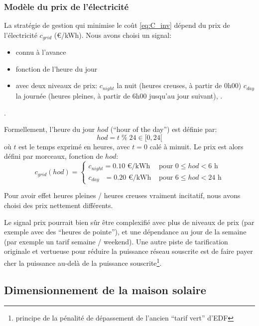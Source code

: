 \documentclass[a4paper,10pt,twocolumn]{article}
\begin{document}
\subsubsection{Modèle du prix de l'électricité}

La stratégie de gestion qui minimise le coût \eqref{eq:C_inv}
dépend du prix de l'électricité $c_{grid}$ (€/kWh).
Nous avons choisi un signal:

\begin{itemize}
 \item connu à l'avance
 \item fonction de l'heure du jour
 \item avec deux niveaux de prix:
 $c_{night}$ la nuit (heures creuses, à partir de 0h00)
 $c_{day}$ la journée (heures pleines, à partir de 6h00 jusqu'au jour suivant), .
\end{itemize}.

Formellement, l'heure du jour $hod$ (``hour of the day'') est définie par:
%
\begin{equation} \label{eq:hod}
  hod = t \; \% \; 24 \in [0, 24[
\end{equation} 
où $t$ est le temps exprimé en heures, avec $t=0$ calé à minuit.
Le prix est alors défini par morceaux, fonction de $hod$:
\begin{equation}
  c_{grid}(hod) = \begin{cases}
    c_{night} = 0.10 \text{ €/kWh} & \text{ pour } 0 \leq hod < 6\text{ h}\\
    c_{day} \;\;\,  = 0.20 \text{ €/kWh} & \text{ pour } 6 \leq hod < 24\text{ h}
  \end{cases}
\end{equation}

Pour avoir effet heures pleines / heures creuses vraiment incitatif,
nous avons choisi des prix nettement différents.

Le signal prix pourrait bien sûr être complexifié avec plus de niveaux de prix
(par exemple avec des ``heures de pointe''), et une dépendance au jour de la semaine
(par exemple un tarif semaine / weekend).
Une autre piste de tarification originale et vertueuse pour réduire la puissance réseau souscrite
est de faire payer cher la puissance au-delà de la puissance souscrite\footnote{
  principe de la pénalité de dépassement de l'ancien ``tarif vert'' d'EDF}.

\subsection{Dimensionnement de la maison solaire}
\end{document}

